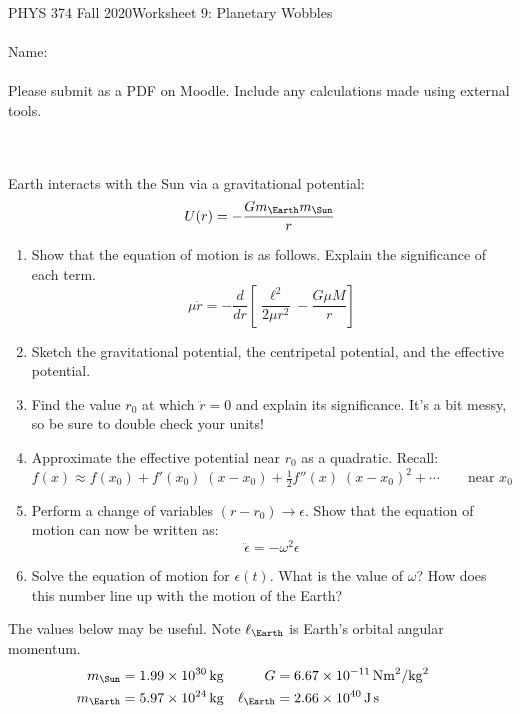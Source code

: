 \documentclass[12pt]{article}
\begin{document}
PHYS 374 Fall 2020\hfill Worksheet 9: Planetary Wobbles\\
\\
Name:\\
\\
Please submit as a PDF on Moodle. Include any calculations made using external tools.

\hrulefill
\\
\\
Earth interacts with the Sun via a gravitational potential:
$$
U(r) = -\frac{G m_\Earth m_\Sun}{r}
$$

\begin{enumerate}
    \item Show that the equation of motion is as follows. Explain the significance of each term.
    $$
    \mu \ddot{r} = -\frac{d}{dr} \left[ \frac{\ell^2}{2 \mu r^2} -\frac{G \mu M}{r} \right]
    $$
    \item Sketch the gravitational potential, the centripetal potential, and the effective potential.
    \item Find the value $r_0$ at which $\ddot{r}=0$ and explain its significance. It's a bit messy, so be sure to double check your units!
    \item Approximate the effective potential near $r_0$ as a quadratic. Recall:
    $$
    f(x) \approx f(x_0) + f'(x_0) \; (x - x_0) + \tfrac{1}{2} f''(x) \; (x - x_0)^2 + \cdots
    \quad\quad\text{near $x_0$}
    $$
    \item Perform a change of variables $(r - r_0) \rightarrow \epsilon$. Show that the equation of motion can now be written as:
    $$
    \ddot{\epsilon} = - \omega^2 \epsilon
    $$
    \item Solve the equation of motion for $\epsilon(t)$. What is the value of $\omega$? How does this number line up with the motion of the Earth?
\end{enumerate}

The values below may be useful. Note $\ell_\Earth$ is Earth's orbital angular momentum.
\begin{align*}
    m_\Sun &= \SI{1.99e30}{\kilo\gram} &
    G &= \SI{6.67e-11}{\newton\meter^2/\kilogram^2} & \\
    m_\Earth &= \SI{5.97e24}{\kilo\gram} & 
    \ell_\Earth &= \SI{2.66e40}{\joule \second}
\end{align*}
\end{document}
